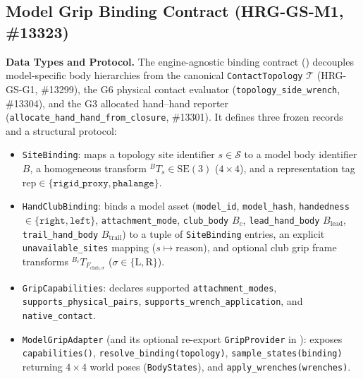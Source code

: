 \documentclass[11pt,a4paper]{article}
\begin{document}
\subsection{Model Grip Binding Contract (HRG-GS-M1, \#13323)}
\textbf{Data Types and Protocol.} The engine-agnostic binding contract ()
decouples model-specific body hierarchies from the canonical \texttt{ContactTopology} $\mathcal{T}$ (HRG-GS-G1, \#13299),
the G6 physical contact evaluator (\texttt{topology\_side\_wrench}, \#13304), and the G3 allocated hand--hand reporter
(\texttt{allocate\_hand\_hand\_from\_closure}, \#13301). It defines three frozen records and a structural protocol:
\begin{itemize}[leftmargin=*,noitemsep]
\item \texttt{SiteBinding}: maps a topology site identifier $s \in \mathcal{S}$ to a model body identifier $B$, a homogeneous
transform ${}^{B}T_{s} \in \mathrm{SE}(3)$ ($4\times 4$), and a representation tag $\mathrm{rep} \in \{\texttt{rigid\_proxy}, \texttt{phalange}\}$.
\item \texttt{HandClubBinding}: binds a model asset (\texttt{model\_id}, \texttt{model\_hash}, \texttt{handedness} $\in \{\texttt{right}, \texttt{left}\}$,
\texttt{attachment\_mode}, \texttt{club\_body} $B_c$, \texttt{lead\_hand\_body} $B_{\mathrm{lead}}$, \texttt{trail\_hand\_body} $B_{\mathrm{trail}}$)
to a tuple of \texttt{SiteBinding} entries, an explicit \texttt{unavailable\_sites} mapping ($s \mapsto \text{reason}$), and optional club grip frame
transforms ${}^{B_c}T_{F_{\mathrm{club},\sigma}}$ ($\sigma \in \{\mathrm{L}, \mathrm{R}\}$).
\item \texttt{GripCapabilities}: declares supported \texttt{attachment\_modes}, \texttt{supports\_physical\_pairs},
\texttt{supports\_wrench\_application}, and \texttt{native\_contact}.
\item \texttt{ModelGripAdapter} (and its optional re-export \texttt{GripProvider} in ):
exposes \texttt{capabilities()}, \texttt{resolve\_binding(topology)}, \texttt{sample\_states(binding)} returning $4\times 4$ world poses
(\texttt{BodyStates}), and \texttt{apply\_wrenches(wrenches)}.
\end{itemize}
\end{document}
